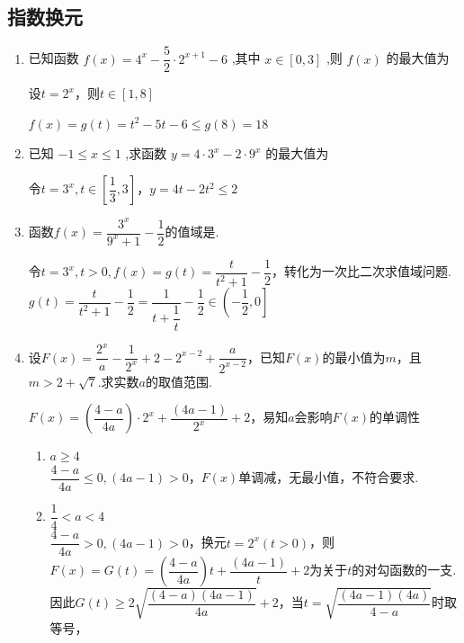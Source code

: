     \subsection*{指数换元}
    \begin{enumerate}
        \item 已知函数 $f\left( x\right)  = {4}^{x} - \dfrac{5}{2} \cdot  {2}^{x + 1} - 6$ ,其中 $x \in  \left\lbrack  {0,3}\right\rbrack$ ,则 $f\left( x\right)$ 的最大值为
        \begin{jieda}
            设$t = 2^x$，则$t \in [1, 8]$
            
            $f(x) = g(t) = t^2-5t-6 \leq g(8) = 18$
        \end{jieda}
    
        \item 已知 $- 1 \leq  x \leq  1$ ,求函数 $y = 4 \cdot  {3}^{x} - 2 \cdot  {9}^{x}$ 的最大值为
        \begin{jieda}
            令$t = 3^x, t \in \left[\dfrac{1}{3}, 3\right]$，$y = 4t-2t^2 \leq 2$
        \end{jieda}
        \item 函数$f(x)=\dfrac{3^x}{9^x+1}-\dfrac{1}{2}$的值域是\blkda{$\left(-\dfrac{1}{2},0\right]$}. 
        \begin{jieda}
        令$t = 3^x, t > 0, f(x) = g(t) = \dfrac{t}{t^2+1} - \dfrac{1}{2}$，转化为一次比二次求值域问题. \\
        $g(t) = \dfrac{t}{t^2+1} - \dfrac{1}{2} = \dfrac{1}{t+\dfrac{1}{t}} - \dfrac{1}{2} \in \left(-\dfrac{1}{2},0\right]$
        \end{jieda}
    \item 设$F(x) = \dfrac{2^x}{a} - \dfrac{1}{2^x} + 2 - 2^{x-2} + \dfrac{a}{2^{x-2}}$，已知$F(x)$的最小值为$m$，且$m > 2 + \sqrt{7}$.求实数$a$的取值范围.
    \begin{jieda}
        $F(x) = \left(\dfrac{4-a}{4a}\right)\cdot2^x + \dfrac{(4a-1)}{2^x} + 2$，易知$a$会影响$F(x)$的单调性
        \begin{enumerate}
            \item $a \geq 4$ \\
            $\dfrac{4-a}{4a} \leq 0, (4a-1) > 0$，$F(x)$单调减，无最小值，不符合要求.
            \item $\dfrac{1}{4} < a < 4$ \\
            $\dfrac{4-a}{4a} > 0, (4a-1) > 0$，换元$t = 2^x (t > 0)$，则$F(x) = G(t) = \left(\dfrac{4-a}{4a}\right)t + \dfrac{(4a-1)}{t} + 2$为关于$t$的对勾函数的一支.因此$G(t) \geq 2\sqrt{\dfrac{(4-a)(4a-1)}{4a}}+2$，当$t = \sqrt{\dfrac{(4a-1)(4a)}{4-a}}$时取等号，\\

\end{enumerate}
\end{jieda}
\end{enumerate}
